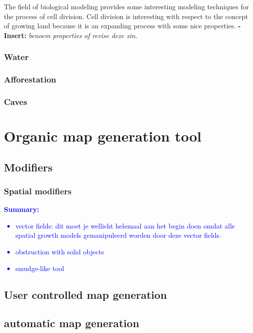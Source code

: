 \documentclass{article}
\newcommand{\inhoud}[1]{\textcolor{blue}{\textbf{\newline Summary: }\it{#1}}}
\newcommand{\voegtoe}[1]{\textcolor{MyDarkGreen}{\textbf{-Insert: }\it{#1}}}
\begin{document}
The field of biological modeling provides some interesting modeling techniques for the process of cell division. 
Cell division is interesting with respect to the concept of growing land because it is an expanding process with some nice properties. \voegtoe{benoem properties of revise deze zin.} 


\subsubsection{Water} 


\subsubsection{Afforestation} 

\subsubsection{Caves}

\section{Organic map generation tool}

\subsection{Modifiers}

\subsubsection{Spatial modifiers}

\inhoud{
\begin{itemize}
\item vector fields: dit moet je wellicht helemaal aan het begin doen omdat alle spatial growth models
gemanipuleerd worden door deze vector fields.
\item obstruction with solid objects
\item smudge-like tool
\end{itemize}
}

\subsection{User controlled map generation}

\subsection{automatic map generation} 
\end{document}

